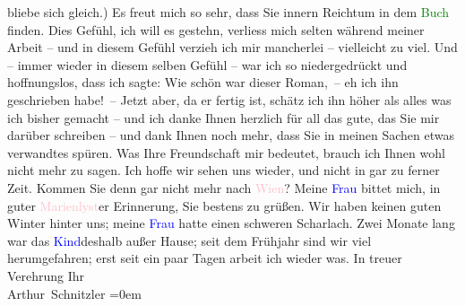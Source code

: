                     bliebe sich gleich.)  Es freut mich so
                    sehr, dass Sie innern Reichtum in dem \textcolor{green}{Buch}{} finden. Dies Gefühl, ich will es gestehn,
                    verliess mich selten während meiner Arbeit – und in diesem Gefühl verzieh ich
                    mir mancherlei – vielleicht zu viel. Und \introOben{}–\introOben{} immer
                    wieder in diesem selben Gefühl – war ich so niedergedrückt und hoffnungslos,
                    dass ich sagte: Wie schön war dieser Roman, – eh ich ihn geschrieben habe! –
                    Jetzt aber, da er fertig ist, schätz ich ihn höher als alles was ich bisher
                    gemacht – und ich danke Ihnen herzlich für all das gute, das Sie mir {\pb}darüber schreiben – und dank Ihnen noch
                    mehr, dass Sie in meinen Sachen etwas verwandtes spüren. Was Ihre Freundschaft
                    mir bedeutet, brauch ich Ihnen wohl nicht mehr zu sagen. Ich hoffe wir sehen uns
                    wieder, und nicht in gar zu ferner Zeit. Kommen Sie denn gar nicht mehr nach \textcolor{pink}{Wien}{}\ledrightnote{\textcolor{pink}{Wien}}?\pend
           \pstart
           Meine \textcolor{blue}{Frau}{} bittet mich, in
                    guter \textcolor{pink}{Marienlyst}{}\ledrightnote{\textcolor{pink}{Marienlyst}}er Erinnerung, Sie bestens zu
                    grüßen. Wir haben keinen guten Winter hinter uns; meine \textcolor{blue}{Frau}{} hatte einen schweren Scharlach. Zwei
                    Monate lang war das \textcolor{blue}{Kind}{}\introOben{}deshalb\introOben{} außer Hause; seit dem Frühjahr sind wir viel
                    herumgefahren; erst seit ein paar Tagen arbeit ich wieder was.\pend
           \pstart
           In treuer Verehrung Ihr{\\[\baselineskip]}\spacefill\mbox{Arthur Schnitzler}\pend
           \leftskip=0em{}\endnumbering{}  
      